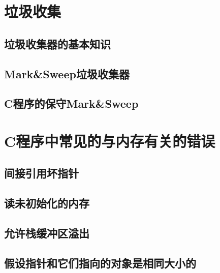 \pending

\section{垃圾收集}

\pending

\subsection{垃圾收集器的基本知识}

\pending

\subsection{Mark\&Sweep垃圾收集器}

\pending

\subsection{C程序的保守Mark\&Sweep}

\pending

\section{C程序中常见的与内存有关的错误}

\pending

\subsection{间接引用坏指针}

\pending

\subsection{读未初始化的内存}

\pending

\subsection{允许栈缓冲区溢出}

\pending

\subsection{假设指针和它们指向的对象是相同大小的}

\pending

